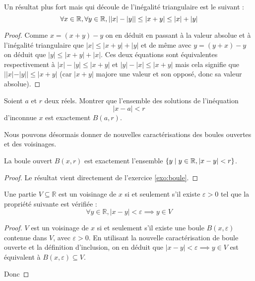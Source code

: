 \begin{cor}
    Un résultat plus fort mais qui découle de l'inégalité triangulaire est le suivant : $$\forall x\in\mathbb{R},\forall y\in\mathbb{R}, ||x|-|y|| \leq |x+y| \leq |x|+|y|$$
\end{cor}

\begin{proof}
    Comme $x = (x + y)-y$ on en déduit en passant à la valeur absolue et à l'inégalité triangulaire que $|x| \leq |x+y|+|y|$ et de même avec $y = (y + x) - y$ on déduit que $|y| \leq |x+y| + |x|$. Ces deux équations sont équivalentes respectivement à $|x|-|y|\leq |x+y|$ et $|y|-|x|\leq |x+y|$ mais cela signifie que $||x|-|y||\leq |x+y|$ (car $|x+y|$ majore une valeur et son opposé, donc sa valeur absolue).
\end{proof}

\begin{exo}\label{exo:boule}
    Soient $a$ et $r$ deux réels. Montrer que l'ensemble des solutions de l'inéquation $$|x-a| < r$$ d'inconnue $x$ est exactement $B(a,r)$.
\end{exo}

Nous pouvons désormais donner de nouvelles caractérisations des boules ouvertes et des voisinages.

\begin{prop}
    La boule ouvert $B(x,r)$ est exactement l'ensemble $\{y\;|\;y\in \mathbb R, |x-y| < r\}$.
\end{prop}

\begin{proof}
    Le résultat vient directement de l'exercice \ref{exo:boule}.
\end{proof}

\begin{prop}\label{prop:voisinage_eps}
    Une partie $V\subseteq \mathbb R$ est un voisinage de $x$ si et seulement s'il existe $\varepsilon > 0$ tel que la propriété suivante est vérifiée : \begin{equation}\label{eq:voisinage}\forall y\in \mathbb R, |x-y| < \varepsilon \implies y\in V\end{equation}
\end{prop}

\begin{proof}
    $V$ est un voisinage de $x$ si et seulement s'il existe une boule $B(x,\varepsilon)$ contenue dans $V$, avec $\varepsilon > 0$. En utilisant la nouvelle caractérisation de boule ouverte et la définition d'inclusion, on en déduit que $|x-y| < \varepsilon \implies y \in V$ est équivalent à $B(x,\varepsilon)\subseteq V$.
    
    Donc 
\end{proof}

